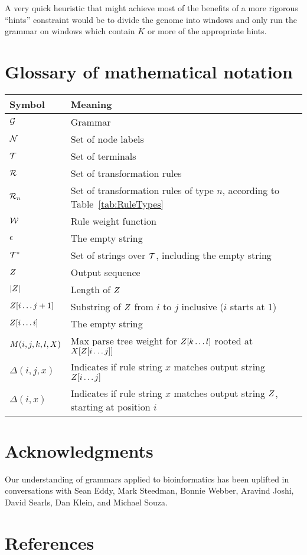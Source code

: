 \documentclass[10pt]{article}
\newcommand{\tabnum}[1]{\ref{tab:#1}}
\newcommand{\tabref}[1]{Table~\tabnum{#1}}
\begin{document}
A very quick heuristic that might achieve most of the benefits of a more rigorous ``hints'' constraint
would be to divide the genome into windows and only run the grammar on windows which contain $K$ or more of the appropriate hints.

\section{Glossary of mathematical notation}

\noindent
\begin{tabular}{ll}
Symbol & Meaning \\
\hline
${\cal G}$ & Grammar \\
${\cal N}$ & Set of node labels \\
${\cal T}$ & Set of terminals \\
${\cal R}$ & Set of transformation rules \\
${\cal R}_{n}$ & Set of transformation rules of type $n$, according to \tabref{RuleTypes} \\
${\cal W}$ & Rule weight function \\
$\epsilon$ & The empty string \\
${\cal T}^\ast$ & Set of strings over ${\cal T}$, including the empty string \\
$Z$ & Output sequence \\
$|Z|$ & Length of $Z$ \\
$Z[i \ldots j+1]$ & Substring of $Z$ from $i$ to $j$ inclusive ($i$ starts at 1) \\
$Z[i \ldots i]$ & The empty string \\
$M(i,j,k,l,X)$ & Max parse tree weight for $Z[k \ldots l]$ rooted at $X[Z[i \ldots j]]$ \\
$\Delta(i,j,x)$ & Indicates if rule string $x$ matches output string $Z[i \ldots j]$ \\
$\Delta(i,x)$ & Indicates if rule string $x$ matches output string $Z$, starting at position $i$ \\
\end{tabular}

\newpage
\section{Acknowledgments}

Our understanding of grammars applied to bioinformatics has been uplifted in conversations with
Sean Eddy, Mark Steedman, Bonnie Webber, Aravind Joshi, David Searls, Dan Klein, and Michael Souza.

\section{References}


\end{document}

